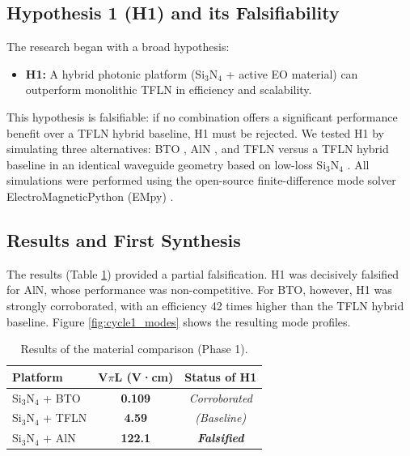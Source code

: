 \documentclass{article}
\begin{document}
\subsection{Hypothesis 1 (H1) and its Falsifiability}
The research began with a broad hypothesis:
\begin{itemize}
    \item \textbf{H1:} A hybrid photonic platform (Si$_3$N$_4$ + active EO material) can outperform monolithic TFLN in efficiency and scalability.
\end{itemize}
This hypothesis is falsifiable: if no combination offers a significant performance benefit over a TFLN hybrid baseline, H1 must be rejected. We tested H1 by simulating three alternatives: BTO \cite{BTO}, AlN \cite{AlN}, and TFLN versus a TFLN hybrid baseline in an identical waveguide geometry based on low-loss Si$_3$N$_4$ \cite{SiN}. All simulations were performed using the open-source finite-difference mode solver ElectroMagneticPython (EMpy) \cite{EMpy}.

\subsection{Results and First Synthesis}
The results (Table \ref{tab:cycle1}) provided a partial falsification. H1 was decisively falsified for AlN, whose performance was non-competitive. For BTO, however, H1 was strongly corroborated, with an efficiency 42 times higher than the TFLN hybrid baseline. Figure \ref{fig:cycle1_modes} shows the resulting mode profiles.

\begin{table}[H]
\caption{Results of the material comparison (Phase 1).}
\label{tab:cycle1}
\centering
\begin{tabular}{lcc}
\toprule
\textbf{Platform} & \textbf{V$\pi$L (V·cm)} & \textbf{Status of H1} \\
\midrule
Si$_3$N$_4$ + BTO & \textbf{0.109} & \textit{Corroborated} \\
Si$_3$N$_4$ + TFLN & \textbf{4.59} & \textit{(Baseline)} \\
Si$_3$N$_4$ + AlN & \textbf{122.1} & \textbf{\textit{Falsified}} \\
\bottomrule
\end{tabular}
\end{table}
\end{document}
